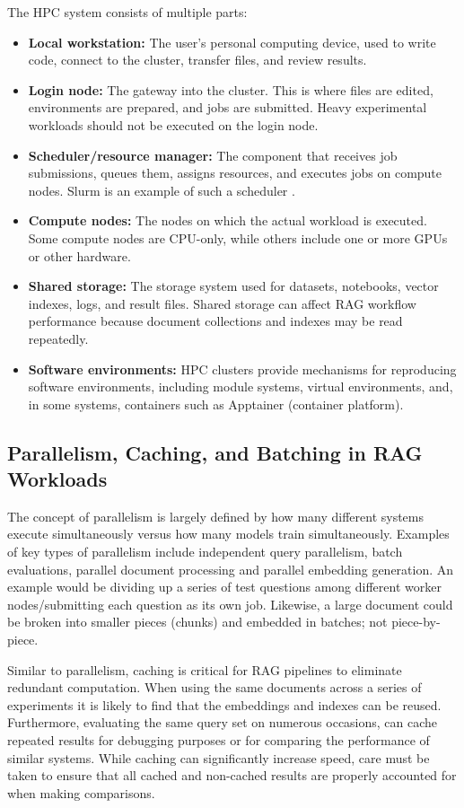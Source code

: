 The \ac{HPC} system consists of multiple parts:

\begin{itemize}
    \item \textbf{Local workstation:} The user's personal computing device, used to write code, connect to the cluster, transfer files, and review results.
    \item \textbf{Login node:} The gateway into the cluster. This is where files are edited, environments are prepared, and jobs are submitted. Heavy experimental workloads should not be executed on the login node.
    \item \textbf{Scheduler/resource manager:} The component that receives job submissions, queues them, assigns resources, and executes jobs on compute nodes. Slurm is an example of such a scheduler \cite{slurm2003}.
    \item \textbf{Compute nodes:} The nodes on which the actual workload is executed. Some compute nodes are CPU-only, while others include one or more \acp{GPU} or other hardware.
    \item \textbf{Shared storage:} The storage system used for datasets, notebooks, vector indexes, logs, and result files. Shared storage can affect \ac{RAG} workflow performance because document collections and indexes may be read repeatedly.
    \item \textbf{Software environments:} \ac{HPC} clusters provide mechanisms for reproducing software environments, including module systems, virtual environments, and, in some systems, containers such as Apptainer (container platform).
\end{itemize}

\subsection{Parallelism, Caching, and Batching in RAG Workloads}

The concept of parallelism is largely defined by how many different systems execute simultaneously versus how many models train simultaneously. Examples of key types of parallelism include independent query parallelism, batch evaluations, parallel document processing and parallel embedding generation. An example would be dividing up a series of test questions among different worker nodes/submitting each question as its own job. Likewise, a large document could be broken into smaller pieces (chunks) and embedded in batches; not piece-by-piece.

Similar to parallelism, caching is critical for \ac{RAG} pipelines to eliminate redundant computation. When using the same documents across a series of experiments it is likely to find that the embeddings and indexes can be reused. Furthermore, evaluating the same query set on numerous occasions, can cache repeated results for debugging purposes or for comparing the performance of similar systems. While caching can significantly increase speed, care must be taken to ensure that all cached and non-cached results are properly accounted for when making comparisons.

